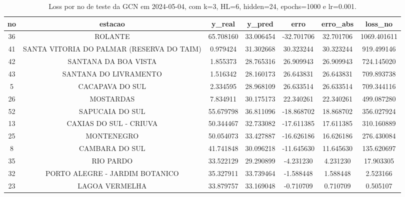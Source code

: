 \begin{table}[h]
\centering
\caption{Loss por no de teste da GCN em 2024-05-04, com k=3, HL=6, hidden=24, epochs=1000 e lr=0.001.}
\label{tab:gcn_loss_k3_hl6_h24_e1000_d20240504}
\begin{tabular}{ccccccc}
\toprule
no & estacao & y\_real & y\_pred & erro & erro\_abs & loss\_no \\
\midrule
36 & ROLANTE & 65.708160 & 33.006454 & -32.701706 & 32.701706 & 1069.401611 \\
41 & SANTA VITORIA DO PALMAR (RESERVA DO TAIM) & 0.979424 & 31.302668 & 30.323244 & 30.323244 & 919.499146 \\
42 & SANTANA DA BOA VISTA & 1.855373 & 28.765316 & 26.909943 & 26.909943 & 724.145020 \\
43 & SANTANA DO LIVRAMENTO & 1.516342 & 28.160173 & 26.643831 & 26.643831 & 709.893738 \\
5 & CACAPAVA DO SUL & 2.334595 & 28.968109 & 26.633514 & 26.633514 & 709.344116 \\
26 & MOSTARDAS & 7.834911 & 30.175173 & 22.340261 & 22.340261 & 499.087280 \\
52 & SAPUCAIA DO SUL & 55.679798 & 36.811096 & -18.868702 & 18.868702 & 356.027924 \\
13 & CAXIAS DO SUL - CRIUVA & 50.344467 & 32.733082 & -17.611385 & 17.611385 & 310.160889 \\
25 & MONTENEGRO & 50.054073 & 33.427887 & -16.626186 & 16.626186 & 276.430084 \\
8 & CAMBARA DO SUL & 41.741848 & 30.096218 & -11.645630 & 11.645630 & 135.620697 \\
35 & RIO PARDO & 33.522129 & 29.290899 & -4.231230 & 4.231230 & 17.903305 \\
32 & PORTO ALEGRE - JARDIM BOTANICO & 35.327911 & 33.739464 & -1.588448 & 1.588448 & 2.523166 \\
23 & LAGOA VERMELHA & 33.879757 & 33.169048 & -0.710709 & 0.710709 & 0.505107 \\
\bottomrule
\end{tabular}
\end{table}
